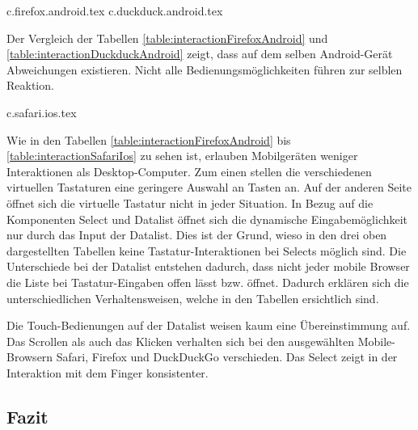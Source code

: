 {c.firefox.android.tex}
{c.duckduck.android.tex}

Der Vergleich der Tabellen \ref{table:interactionFirefoxAndroid} und \ref{table:interactionDuckduckAndroid} zeigt, dass auf dem selben Android-Gerät Abweichungen existieren.
Nicht alle Bedienungsmöglichkeiten führen zur selblen Reaktion.

\clearpage
{c.safari.ios.tex}

Wie in den Tabellen \ref{table:interactionFirefoxAndroid} bis \ref{table:interactionSafariIos} zu sehen ist, erlauben Mobilgeräten weniger Interaktionen als Desktop-Computer.
Zum einen stellen die verschiedenen virtuellen Tastaturen eine geringere Auswahl an Tasten an.
Auf der anderen Seite öffnet sich die virtuelle Tastatur nicht in jeder Situation. 
In Bezug auf die Komponenten Select und Datalist öffnet sich die dynamische Eingabemöglichkeit nur durch das Input der Datalist.
Dies ist der Grund, wieso in den drei oben dargestellten Tabellen keine Tastatur-Interaktionen bei Selects möglich sind. 
Die Unterschiede bei der Datalist entstehen dadurch, dass nicht jeder mobile Browser die Liste bei Tastatur-Eingaben offen lässt bzw. öffnet.
Dadurch erklären sich die unterschiedlichen Verhaltensweisen, welche in den Tabellen ersichtlich sind.

Die Touch-Bedienungen auf der Datalist weisen kaum eine Übereinstimmung auf. 
Das Scrollen als auch das Klicken verhalten sich bei den ausgewählten Mobile-Browsern Safari, Firefox und DuckDuckGo verschieden.
Das Select zeigt in der Interaktion mit dem Finger konsistenter. 


\clearpage
\subsection{Fazit}
\label{sec:summeryExisting}

